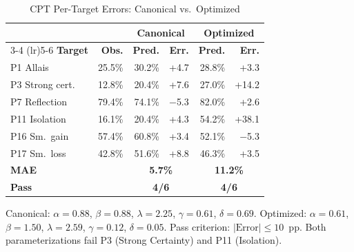 \documentclass[journal]{IEEEtran}
\providecommand{\DIFaddbegin}{} %
\providecommand{\DIFaddend}{} %
\providecommand{\DIFaddincludegraphics}[2][]{{\color{blue}\fbox{\DIFOincludegraphics[#1]{#2}}}} %
\DeclareRobustCommand{\DIFaddbegin}{\DIFOaddbegin \let\includegraphics\DIFaddincludegraphics} %
\DeclareRobustCommand{\DIFaddend}{\DIFOaddend \let\includegraphics\DIFOincludegraphics} %
\begin{document}
\DIFaddbegin \begin{table}[!h]
\renewcommand{\arraystretch}{1.15}
\caption{CPT Per-Target Errors: Canonical vs.\ Optimized}
\label{tab:cpt_detail}
\centering
\begin{tabular}{l r r r r r}
\toprule
& & \multicolumn{2}{c}{\textbf{Canonical}} & \multicolumn{2}{c}{\textbf{Optimized}} \\
\cmidrule(lr){3-4} \cmidrule(lr){5-6}
\textbf{Target} & \textbf{Obs.} & \textbf{Pred.} & \textbf{Err.} & \textbf{Pred.} & \textbf{Err.} \\
\midrule
P1 Allais       & 25.5\% & 30.2\% & +4.7  & 28.8\% & +3.3  \\
P3 Strong cert.  & 12.8\% & 20.4\% & +7.6  & 27.0\% & +14.2 \\
P7 Reflection   & 79.4\% & 74.1\% & $-$5.3 & 82.0\% & +2.6  \\
P11 Isolation   & 16.1\% & 20.4\% & +4.3  & 54.2\% & +38.1 \\
P16 Sm.\ gain   & 57.4\% & 60.8\% & +3.4  & 52.1\% & $-$5.3 \\
P17 Sm.\ loss   & 42.8\% & 51.6\% & +8.8  & 46.3\% & +3.5  \\
\midrule
\textbf{MAE}    &        & \multicolumn{2}{c}{\textbf{5.7\%}} & \multicolumn{2}{c}{\textbf{11.2\%}} \\
\textbf{Pass}   &        & \multicolumn{2}{c}{\textbf{4/6}}   & \multicolumn{2}{c}{\textbf{4/6}}   \\
\bottomrule
\end{tabular}
\begin{flushleft}
\footnotesize{Canonical: $\alpha=0.88$, $\beta=0.88$, $\lambda=2.25$, $\gamma=0.61$, $\delta=0.69$.
Optimized: $\alpha=0.61$, $\beta=1.50$, $\lambda=2.59$, $\gamma=0.12$, $\delta=0.05$.
Pass criterion: $|\text{Error}| \leq 10$~pp.
Both parameterizations fail P3 (Strong Certainty) and P11 (Isolation).}
\end{flushleft}
\end{table}

\DIFaddend %
\end{document}
